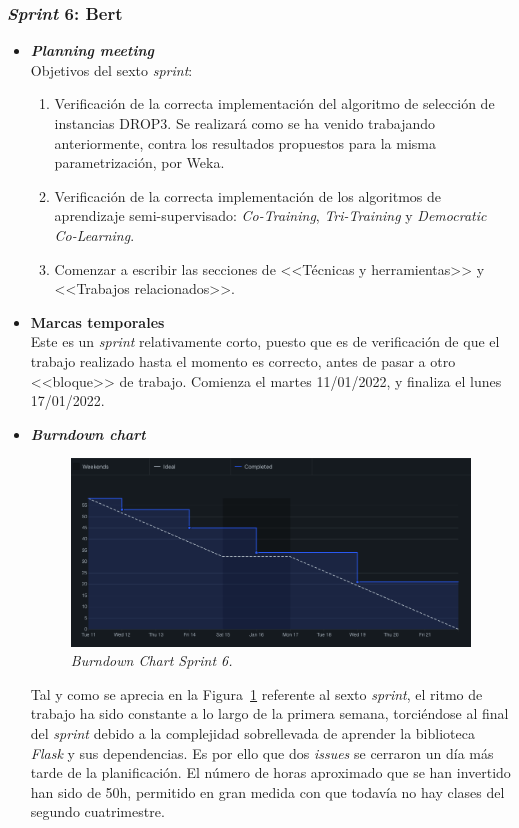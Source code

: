 \subsubsection{\textit{Sprint} 6: Bert}
\begin{itemize}
\item \textbf{\textit{Planning meeting}}\\
Objetivos del sexto \textit{sprint}:
\begin{enumerate}
\item Verificación de la correcta implementación del algoritmo de selección de instancias DROP3. Se realizará como se ha venido trabajando anteriormente, contra los resultados propuestos para la misma parametrización, por Weka.
\item Verificación de la correcta implementación de los algoritmos de aprendizaje semi-supervisado: \textit{Co-Training}, \textit{Tri-Training} y \textit{Democratic Co-Learning}.
\item Comenzar a escribir las secciones de <<Técnicas y herramientas>> y <<Trabajos relacionados>>.
\end{enumerate}

\item \textbf{Marcas temporales}\\
Este es un \textit{sprint} relativamente corto, puesto que es de verificación de que el trabajo realizado hasta el momento es correcto, antes de pasar a otro <<bloque>> de trabajo. Comienza el martes 11/01/2022, y finaliza el lunes 17/01/2022.

\item \textbf{\textit{Burndown chart}}\\
\begin{figure}
\begin{center}
\includegraphics[width=\textwidth]{../img/anexos/sprints/BD-Sprint6}
\caption{\textit{Burndown Chart Sprint 6.}}\label{fig:BD-Sprint6}
\end{center}
\end{figure}
Tal y como se aprecia en la Figura~\ref{fig:BD-Sprint6} referente al sexto \textit{sprint}, el ritmo de trabajo ha sido constante a lo largo de la primera semana, torciéndose al final del \textit{sprint} debido a la complejidad sobrellevada de aprender la biblioteca \textit{Flask} y sus dependencias. Es por ello que dos \textit{issues} se cerraron un día más tarde de la planificación.
El número de horas aproximado que se han invertido han sido de 50h, permitido en gran medida con que todavía no hay clases del segundo cuatrimestre.


\end{itemize}
